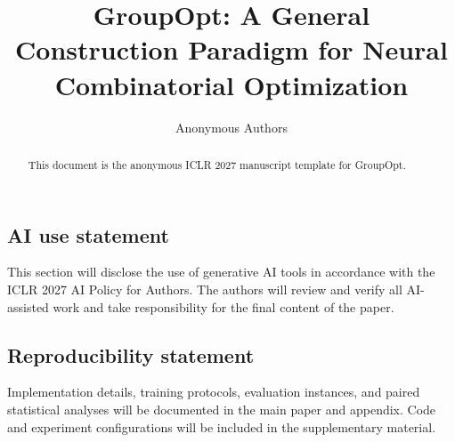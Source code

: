 \documentclass{article}
\title{GroupOpt: A General Construction Paradigm for Neural Combinatorial Optimization}
\author{Anonymous Authors}
\begin{document}
\maketitle

\begin{abstract}
This document is the anonymous ICLR 2027 manuscript template for GroupOpt.
\end{abstract}







\subsection*{AI use statement}
This section will disclose the use of generative AI tools in accordance with
the ICLR 2027 AI Policy for Authors. The authors will review and verify all
AI-assisted work and take responsibility for the final content of the paper.

\subsection*{Reproducibility statement}
Implementation details, training protocols, evaluation instances, and paired
statistical analyses will be documented in the main paper and appendix. Code
and experiment configurations will be included in the supplementary material.





\appendix

\end{document}
